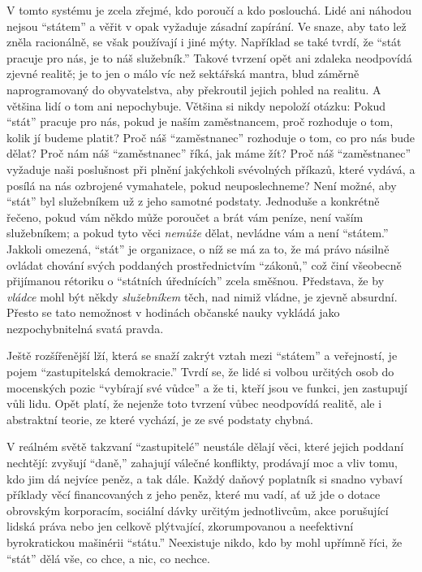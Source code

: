 \documentclass{book}
\begin{document}
V tomto systému je zcela zřejmé, kdo poroučí a kdo poslouchá. Lidé ani náhodou nejsou \enquote{státem} a věřit v opak vyžaduje zásadní zapírání. Ve snaze, aby tato lež zněla racionálně, se však používají i jiné mýty. Například se také tvrdí, že \enquote{stát pracuje pro nás, je to náš služebník.} Takové tvrzení opět ani zdaleka neodpovídá zjevné realitě; je to jen o málo víc než sektářská mantra, blud záměrně naprogramovaný do obyvatelstva, aby překroutil jejich pohled na realitu. A většina lidí o tom ani nepochybuje. Většina si nikdy nepoloží otázku: Pokud \enquote{stát} pracuje pro nás, pokud je naším zaměstnancem, proč rozhoduje o tom, kolik jí budeme platit? Proč náš \enquote{zaměstnanec} rozhoduje o tom, co pro nás bude dělat? Proč nám náš \enquote{zaměstnanec} říká, jak máme žít? Proč náš \enquote{zaměstnanec} vyžaduje naši poslušnost při plnění jakýchkoli svévolných příkazů, které vydává, a posílá na nás ozbrojené vymahatele, pokud neuposlechneme? Není možné, aby \enquote{stát} byl služebníkem už z jeho samotné podstaty. Jednoduše a konkrétně řečeno, pokud vám někdo může poroučet a brát vám peníze, není vaším služebníkem; a pokud tyto věci \emph{nemůže} dělat, nevládne vám a není \enquote{státem.} Jakkoli omezená, \enquote{stát} je organizace, o níž se má za to, že má právo násilně ovládat chování svých poddaných prostřednictvím \enquote{zákonů,} což činí všeobecně přijímanou rétoriku o \enquote{státních úřednících} zcela směšnou. Představa, že by \emph{vládce} mohl být někdy \emph{služebníkem} těch, nad nimiž vládne, je zjevně absurdní. Přesto se tato nemožnost v hodinách občanské nauky vykládá jako nezpochybnitelná svatá pravda.

Ještě rozšířenější lží, která se snaží zakrýt vztah mezi \enquote{státem} a veřejností, je pojem \enquote{zastupitelská demokracie.} Tvrdí se, že lidé si volbou určitých osob do mocenských pozic \enquote{vybírají své vůdce} a že ti, kteří jsou ve funkci, jen zastupují vůli lidu. Opět platí, že nejenže toto tvrzení vůbec neodpovídá realitě, ale i abstraktní teorie, ze které vychází, je ze své podstaty chybná.

V reálném světě takzvaní \enquote{zastupitelé} neustále dělají věci, které jejich poddaní nechtějí: zvyšují \enquote{daně,} zahajují válečné konflikty, prodávají moc a vliv tomu, kdo jim dá nejvíce peněz, a tak dále. Každý daňový poplatník si snadno vybaví příklady věcí financovaných z jeho peněz, které mu vadí, ať už jde o dotace obrovským korporacím, sociální dávky určitým jednotlivcům, akce porušující lidská práva nebo jen celkově plýtvající, zkorumpovanou a neefektivní byrokratickou mašinérii \enquote{státu.} Neexistuje nikdo, kdo by mohl upřímně říci, že \enquote{stát} dělá vše, co chce, a nic, co nechce.
\end{document}
